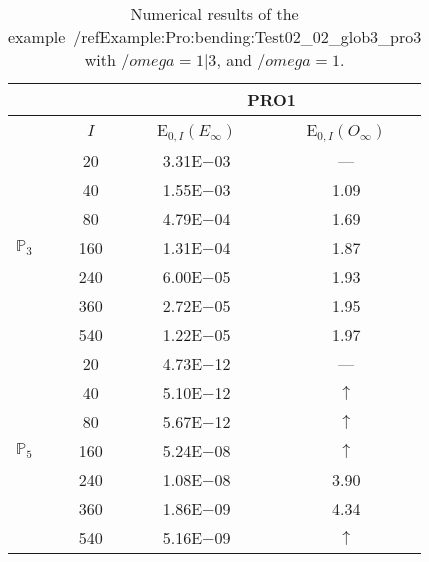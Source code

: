 \begin{table}[H]
\caption{Numerical results of the example~/ref{Example:Pro:bending:Test02_02_glob3_pro3} with $/omega=1|3$, and $/omega=1$.}
\setlength{\tabcolsep}{5pt}
\centering
\begin{tabular}{@{}l c c c@{}}
\toprule
 &  & \multicolumn{2}{c}{PRO1}\\
\midrule
 & $I$ & E$_{0,I}(E_{\infty})$ & E$_{0,I}(O_{\infty})$\\
\midrule
\multirow{7}{*}{$\mathbb{P}_{3}$}
 & 20 & 3.31E$-$03 & ---\\
 & 40 & 1.55E$-$03 & 1.09\\
 & 80 & 4.79E$-$04 & 1.69\\
 & 160 & 1.31E$-$04 & 1.87\\
 & 240 & 6.00E$-$05 & 1.93\\
 & 360 & 2.72E$-$05 & 1.95\\
 & 540 & 1.22E$-$05 & 1.97\\
\midrule
\multirow{7}{*}{$\mathbb{P}_{5}$}
 & 20 & 4.73E$-$12 & ---\\
 & 40 & 5.10E$-$12 & $\uparrow$\\
 & 80 & 5.67E$-$12 & $\uparrow$\\
 & 160 & 5.24E$-$08 & $\uparrow$\\
 & 240 & 1.08E$-$08 & 3.90\\
 & 360 & 1.86E$-$09 & 4.34\\
 & 540 & 5.16E$-$09 & $\uparrow$\\
\bottomrule
\end{tabular}
\label{Table:PRO:test_02_02_test10_pro3}
\end{table}
